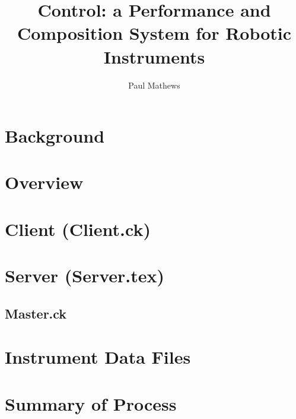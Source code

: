 \documentclass[11pt]{article}
\title{Control: a Performance and Composition System for Robotic Instruments}
\author{Paul Mathews}
\begin{document}
\maketitle

\section{Background}


\section{Overview}


\section{Client (Client.ck)}


\section{Server (Server.tex)}

\subsection{Master.ck}


\section{Instrument Data Files}


\section{Summary of Process}

\end{document}
